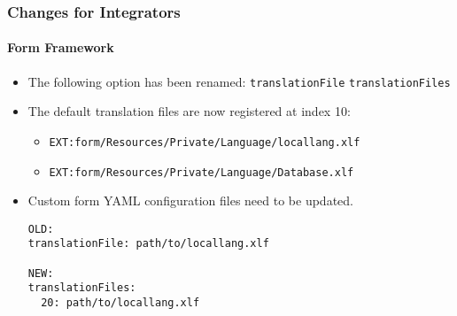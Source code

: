 \begin{frame}[fragile]
	\frametitle{Changes for Integrators}
	\framesubtitle{Form Framework}

	\lstset{basicstyle=\tiny\ttfamily}

	\begin{itemize}
		\item The following option has been renamed:\newline
			\small\texttt{translationFile} \textrightarrow\hspace{0.1cm}\texttt{translationFiles}\normalsize
		\item The default translation files are now registered at index 10:

			\begin{itemize}
				\item \texttt{EXT:form/Resources/Private/Language/locallang.xlf}
				\item \texttt{EXT:form/Resources/Private/Language/Database.xlf}
			\end{itemize}

		\item Custom form YAML configuration files need to be updated.

\begin{lstlisting}
OLD:
translationFile: path/to/locallang.xlf

NEW:
translationFiles:
  20: path/to/locallang.xlf
\end{lstlisting}

	\end{itemize}

\end{frame}


